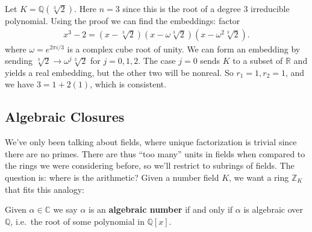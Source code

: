 \begin{example}

Let \(K = {\mathbb{Q}}(\sqrt[3]{2})\). Here \(n=3\) since this is the
root of a degree 3 irreducible polynomial. Using the proof we can find
the embeddings: factor
\begin{align*}
x^3 - 2 = (x - \sqrt[3]{2})(x - \omega \sqrt[3]{2}) (x - \omega^2 \sqrt[3]{2})
.\end{align*}
where \(\omega = e^{2\pi i / 3}\) is a complex cube root of unity. We
can form an embedding by sending
\(\sqrt[3]{2} \to \omega^j \sqrt[3]{2}\) for \(j=0,1,2\). The case
\(j=0\) sends \(K\) to a subset of \({\mathbb{R}}\) and yields a real
embedding, but the other two will be nonreal. So \(r_1 = 1, r_2 = 1\),
and we have \(3 = 1 + 2(1)\), which is consistent.

\end{example}

\hypertarget{algebraic-closures}{%
\subsection{Algebraic Closures}\label{algebraic-closures}}

\begin{remark}

We've only been talking about fields, where unique factorization is
trivial since there are no primes. There are thus ``too many'' units in
fields when compared to the rings we were considering before, so we'll
restrict to subrings of fields. The question is: where is the
arithmetic? Given a number field \(K\), we want a ring
\({\mathbb{Z}}_K\) that fits this analogy:

\begin{center}
\end{center}

\end{remark}

\begin{definition}

Given \(\alpha\in {\mathbb{C}}\) we say \(\alpha\) is an
\textbf{algebraic number} if and only if \(\alpha\) is algebraic over
\({\mathbb{Q}}\), i.e.~the root of some polynomial in
\({\mathbb{Q}}[x]\).

\end{definition}

